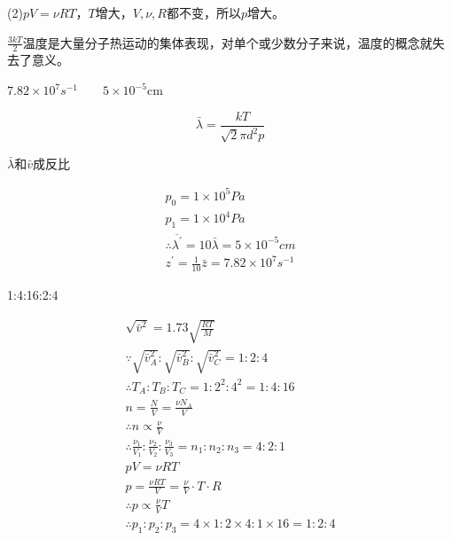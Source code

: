 \documentclass[b5paper,opensource]{./template/qyxf-book}
\begin{document}
(2)$pV=\nu RT$，$T$增大，$V,\nu,R$都不变，所以$p$增大。

$\frac{3kT}{2}$\qquad 温度是大量分子热运动的集体表现，对单个或少数分子来说，温度的概念就失去了意义。

$
7.82 \times 10 ^ { 7 } s ^ { - 1 } \qquad5 \times 10 ^ { - 5 } \mathrm { cm }
$

\solve

$$
\bar { \lambda } = \frac { k T } { \sqrt { 2 } \pi d ^ { 2 } p }
$$

$\bar { \lambda } $和$\bar { v } $成反比

$$
\begin{array} { l } { p _ { 0 } = 1 \times 10 ^ { 5 } P a } \\ { p _ { 1 } = 1 \times 10 ^ { 4 } P a } \\ { \therefore \overline { \lambda ^ { \prime } } = 10 \bar { \lambda } = 5 \times 10 ^ { - 5 } c m } \\ { z ^ { \prime } = \frac { 1 } { 10 } \bar { z } = 7.82 \times 10 ^ { 7 } s ^ { - 1 } } \end{array}
$$

 1:4:16:2:4

\solve

$$
\begin{array}{*{20}{c}} \sqrt { \bar { v } ^ { 2 } } = 1.73 \sqrt { \frac { R T } { M } } \\ \because \sqrt { \bar { v } _ { A } ^ { 2 } } : \sqrt { \bar { v } _ { B } ^ { 2 } }  : \sqrt { \bar { v } _ { C } ^ { 2 } } = 1 : 2 : 4 \\ \therefore T _ { A } : T _ { B } : T _ { C } = 1 : 2 ^ { 2 } : 4 ^ { 2 } = 1 : 4 : 16 \\ n = \frac { N } { V } = \frac { \nu N _ { A } } { V } \\ \therefore n \propto \frac { \nu } { V }\\ \therefore \frac { \nu _ { 1 } } { V _ { 1 } } : \frac { \nu _ { 2 } } { V _ { 2 } } : \frac { \nu _ { 3 } } { V _ { 3 } }  = n _ { 1 } : n _ { 2 } : n _ { 3 } = 4 : 2 : 1 \\ p V  = \nu R T \\ p = \frac { \nu R T } { V }  = \frac { \nu } { V } \cdot T \cdot R \\ \therefore p  \propto \frac { \nu } { V } T \\ \therefore p _ { 1 } : p _ { 2 } : p _ { 3 } = 4 \times 1 : 2 \times 4 : 1 \times 16 = 1 : 2 : 4  \end{array}
$$
\end{document}
